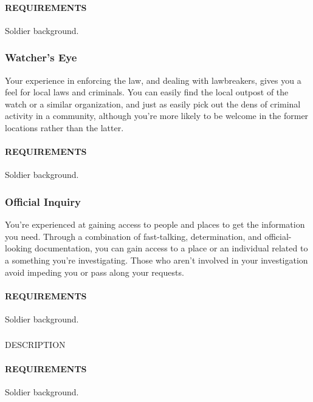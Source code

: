         \paragraph{REQUIREMENTS} Soldier background.

    \subsubsection{Watcher's Eye} \label{feat::watcherseye}
        Your experience in enforcing the law, and dealing with lawbreakers, gives you a feel for local laws and criminals.
        You can easily find the local outpost of the watch or a similar organization, and just as easily pick out the dens of criminal activity in a community, although you're more likely to be welcome in the former locations rather than the latter.
        \paragraph{REQUIREMENTS} Soldier background.

    \subsubsection{Official Inquiry} \label{feat::officialinquiry}
        You're experienced at gaining access to people and places to get the information you need.
        Through a combination of fast-talking, determination, and official-looking documentation, you can gain access to a place or an individual related to a something you're investigating.
        Those who aren't involved in your investigation avoid impeding you or pass along your requests.
        \paragraph{REQUIREMENTS} Soldier background.

    \subsubsection{} \label{feat::NAME}
        DESCRIPTION
        \paragraph{REQUIREMENTS} Soldier background.


